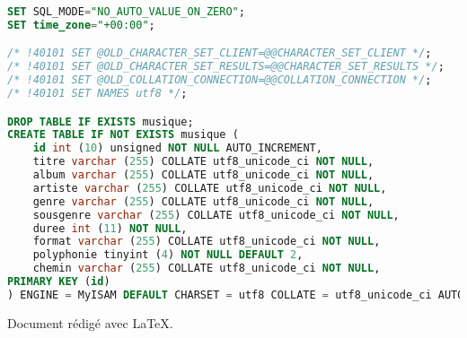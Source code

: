 \documentclass[a4paper,titlepage,oneside]{article}
\begin{document}
\newpage
\begin{lstlisting}[language=sql, caption={Script SQL de la structure de la base de données employée}, label={scriptSQL}]
SET SQL_MODE="NO_AUTO_VALUE_ON_ZERO";
SET time_zone="+00:00";

/* !40101 SET @OLD_CHARACTER_SET_CLIENT=@@CHARACTER_SET_CLIENT */;
/* !40101 SET @OLD_CHARACTER_SET_RESULTS=@@CHARACTER_SET_RESULTS */;
/* !40101 SET @OLD_COLLATION_CONNECTION=@@COLLATION_CONNECTION */;
/* !40101 SET NAMES utf8 */;

DROP TABLE IF EXISTS musique;
CREATE TABLE IF NOT EXISTS musique (
	id int (10) unsigned NOT NULL AUTO_INCREMENT,
	titre varchar (255) COLLATE utf8_unicode_ci NOT NULL,
	album varchar (255) COLLATE utf8_unicode_ci NOT NULL,
	artiste varchar (255) COLLATE utf8_unicode_ci NOT NULL,
	genre varchar (255) COLLATE utf8_unicode_ci NOT NULL,
	sousgenre varchar (255) COLLATE utf8_unicode_ci NOT NULL,
	duree int (11) NOT NULL,
	format varchar (255) COLLATE utf8_unicode_ci NOT NULL,
	polyphonie tinyint (4) NOT NULL DEFAULT 2,
	chemin varchar (255) COLLATE utf8_unicode_ci NOT NULL,
PRIMARY KEY (id)
) ENGINE = MyISAM DEFAULT CHARSET = utf8 COLLATE = utf8_unicode_ci AUTO_INCREMENT=1403;
\end{lstlisting}

\vfill
Document rédigé avec \LaTeX{}.
\end{document}
